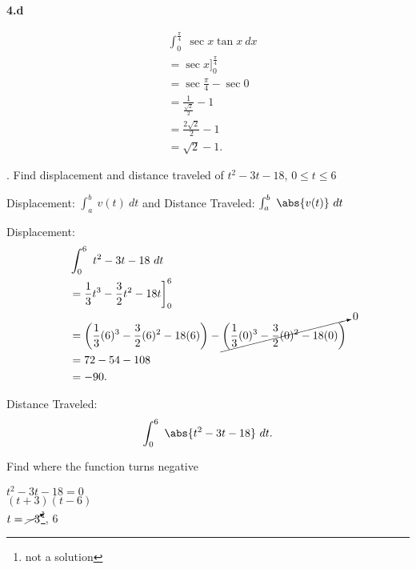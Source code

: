 \documentclass{report}
\begin{document}
    \pagebreak \bigbreak \noindent 
    \textbf{4.d}
    \bigbreak \noindent 
    \begin{minipage}{0.7\textwidth}
    \begin{align*}
        &\int_{0}^{\frac{\pi}{4}}\ \sec{x}\tan{x}\ dx \\
        &= \sec{x}\bigg]^{\frac{\pi}{4}}_0 \\
        &= \sec{\frac{\pi}{4}} - \sec{0} \\
        &= \frac{1}{\frac{\sqrt{2}}{2}} - 1 \\
        &= \frac{2\sqrt{2}}{2} - 1 \\
        &= \sqrt{2} -1
    .\end{align*}
    \end{minipage}

    \bigbreak {}. Find displacement and distance traveled of $t^{2}-3t-18$, $0 \leq t \leq 6 $
    \bigbreak \noindent 
    \begin{remark}
        Displacement: $\int_{a}^{b}\ v(t)\ dt$ and 
        Distance Traveled: $\int_{a}^{b}\ \abs{v(t)}\ dt $
    \end{remark}
    \bigbreak \noindent 

    Displacement:
    \begin{align*}
        &\int_{0}^{6}\ t^{2}-3t-18\ dt \\
        &= \frac{1}{3}t^{3}-\frac{3}{2}t^{2}-18t\bigg]^{6}_0 \\
        &= \bigg(\frac{1}{3}(6)^{3} - \frac{3}{2}(6)^{2}-18(6)\bigg) - \cancelto{0}{\bigg(\frac{1}{3}(0)^{3} -\frac{3}{2}(0)^{2}-18(0)\bigg)} \\
        &= 72 - 54 - 108 \\
        &= -90
    .\end{align*}
    \bigbreak \noindent 

    Distance Traveled:
    \begin{align*}
        \int_{0}^{6}\ \abs{t^{2}-3t-18}\ dt
    .\end{align*}
    \bigbreak \noindent 
    
    Find where the function turns negative
    \begin{center}
        
        $t^{2} - 3t-18 = 0$ \\
        $(t+3)(t-6)$ \\
        $t = \cancelto{}{-3}$\footnote{not a solution}, 6
    \end{center}
    \bigbreak \noindent 
    
\end{document}
